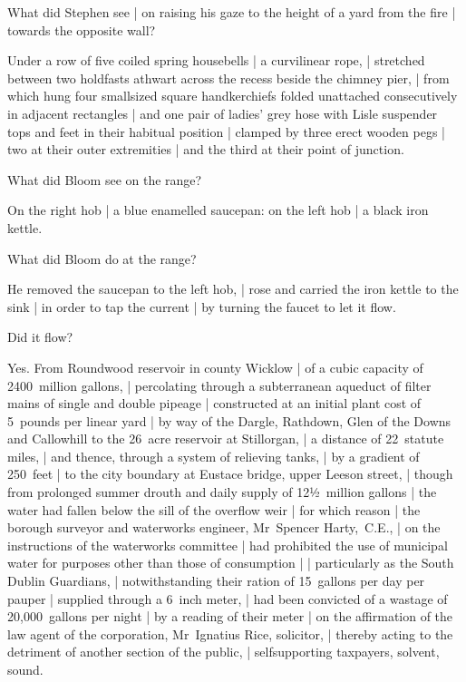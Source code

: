 
What did Stephen see |
on raising his gaze to the height of a yard from the fire |
towards the opposite wall?

\Factual
Under a row of five coiled spring housebells |
a curvilinear rope, |
stretched between two holdfasts athwart
across the recess beside the chimney pier, |
from which hung four smallsized square handkerchiefs
folded unattached consecutively in adjacent rectangles |
and one pair of ladies' grey hose
with Lisle suspender tops and feet in their habitual position |
clamped by three erect wooden pegs |
two at their outer extremities |
and the third at their point of junction.



What did Bloom see on the range?

\Household
On the right
hob |
a blue enamelled saucepan:
on the left
hob |
a black iron kettle.



What did Bloom do at the range?

\Household
He removed the saucepan to the left hob, |
rose and carried the iron kettle to the sink |
in order to tap the current |
by turning the faucet to let it flow.


Did it flow?

\Science
Yes.
From Roundwood reservoir in county Wicklow |
of a cubic capacity of 2400~million gallons, |
percolating through a subterranean aqueduct
of filter mains of single and double pipeage |
constructed at an initial plant cost
of 5~pounds per linear yard |
by way of the Dargle, Rathdown, Glen of the Downs and Callowhill
to the 26~acre reservoir at Stillorgan, |
a distance of 22~statute miles, |
and thence,
through a system of relieving tanks, |
by a gradient of 250~feet |
to the city boundary at Eustace bridge, upper Leeson street, |
though from prolonged summer drouth
and daily supply of 12½~million gallons |
the water had fallen below the sill of the overflow weir |
for which reason |
the borough surveyor and waterworks engineer,
Mr~Spencer Harty,~C.E., |
on the instructions of the waterworks committee |
had prohibited the use of municipal water
for purposes other than those of consumption |
 |
particularly as the South Dublin Guardians, |
notwithstanding their ration of 15~gallons per day per pauper |
supplied through a 6~inch meter, |
had been convicted of a wastage of 20,000~gallons per night |
by a reading of their meter |
on the affirmation of the law agent of the corporation,
Mr~Ignatius Rice, solicitor, |
thereby acting to the detriment of another section of the public, |
selfsupporting taxpayers, solvent, sound.

